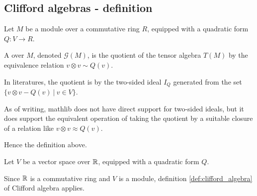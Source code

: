 \subsection{Clifford algebras - definition}
\label{sec:def}







\begin{definition}
    \label{def:clifford_algebra}
    \leanok

    Let $M$ be a module over a commutative ring $R$, equipped with a quadratic form $Q: V \to R$.

    A  over $M$, denoted $\mathcal{G}(M)$, is
    the quotient of the tensor algebra $T(M)$
    by the equivalence relation $v \otimes v \sim Q(v)$.
\end{definition}

\begin{remark}
  \label{mk:two_sided_ideals}
  
  In literatures, the quotient is by the two-sided ideal $I_Q$ generated from the set
  $\{ v \otimes v - Q(v) \:\vert\: v \in V \}$.

  As of writing, mathlib does not have direct support for two-sided ideals,
  but it does support the equivalent operation of taking the quotient by a suitable closure of
  a relation like $v \otimes v \approx Q(v)$.

  Hence the definition above.

\end{remark}

\begin{example}
  \label{ex:clifford_algebra_v}

  Let $V$ be a vector space over $\mathbb R$, equipped with a quadratic form $Q$.
  
  Since $\mathbb R$ is a commutative ring and $V$ is a module,
  definition \ref{def:clifford_algebra} of Clifford algebra applies.
\end{example}

